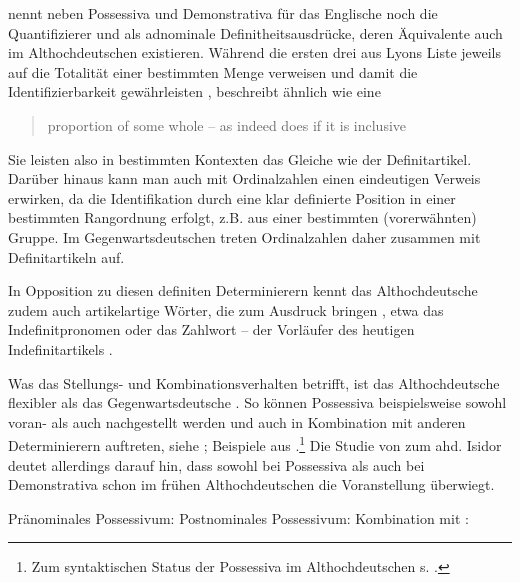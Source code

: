 \textcite[32--34]{Lyons1999} nennt neben Possessiva  und Demonstrativa  für das Englische noch die   Quantifizierer  und  als adnominale Definitheitsausdrücke,  deren Äquivalente auch im Althochdeutschen existieren. Während die ersten drei aus Lyons Liste jeweils auf die Totalität einer bestimmten Menge verweisen und damit die Identifizierbarkeit gewährleisten \parencite[vgl. auch][334]{Hoffmann2009}, beschreibt  ähnlich wie  eine \blockcquote[33]{Lyons1999}{proportion of some whole -- as indeed does  if it is inclusive}. Sie leisten also in bestimmten Kontexten das Gleiche wie der Definitartikel. 
Darüber hinaus kann man auch mit Ordinalzahlen einen eindeutigen Verweis erwirken, da die Identifikation durch eine klar definierte Position in einer bestimmten Rangordnung erfolgt, z.B.  aus einer bestimmten (vorerwähnten) Gruppe. Im Gegenwartsdeutschen treten Ordinalzahlen daher zusammen mit Definitartikeln  auf.

In Opposition zu diesen definiten Determinierern  kennt das Althochdeutsche zudem auch artikelartige Wörter, die  zum Ausdruck bringen \parencite[253--254]{Braune2004}, etwa das Indefinitpronomen   \parencite{Donhauser2012} oder das Zahlwort  -- der Vorläufer des heutigen Indefinitartikels  \parencite{Oubouzar2000,Szczepaniak2016}. 

Was das Stellungs- und Kombinationsverhalten betrifft, ist das Althochdeutsche  flexibler als das Gegenwartsdeutsche \parencite[104]{Szczepaniak2011a}. So können Possessiva  beispielsweise sowohl voran- als auch nachgestellt werden und auch in Kombination mit anderen Determinierern  auftreten, siehe ; Beispiele aus \textcite[27--28]{Schrodt2004}.\footnote{Zum syntaktischen Status der Possessiva  im Althochdeutschen s. \textcite[132--135]{Demske2001}.} Die Studie von \textcite{Flick2018} zum ahd. Isidor deutet allerdings darauf hin, dass sowohl bei Possessiva  als auch bei Demonstrativa  schon im frühen Althochdeutschen die Voranstellung überwiegt. 

\begin{exe}
	\ex \label{ex:poss-stellung}   
	\begin{xlist}
		\ex \label{ex:possvor} Pränominales Possessivum:  
		\ex \label{ex:possnach} Postnominales Possessivum:   
		\ex \label{ex:posskombi} Kombination mit :  
		\end{xlist}
\end{exe}


